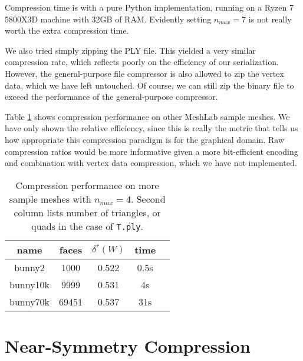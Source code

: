 \documentclass{egpubl}
\begin{document}
Compression time is with a pure Python implementation, running on a Ryzen 7 5800X3D machine with 32GB of RAM. Evidently setting $n_{max} = 7$ is not really worth the extra compression time.

We also tried simply zipping the PLY file. This yielded a very similar compression rate, which reflects poorly on the efficiency of our serialization. However, the general-purpose file compressor is also allowed to zip the vertex data, which we have left untouched. Of course, we can still zip the binary file to exceed the performance of the general-purpose compressor.


Table \ref{tab:more_meshes} shows compression performance on other MeshLab sample meshes.
We have only shown the relative efficiency, since this is really the metric that tells us how appropriate this compression paradigm is for the graphical domain. Raw compression ratios would be more informative given a more bit-efficient encoding and combination with vertex data compression, which we have not implemented.

\begin{table}
        \centering
        \begin{tabular}{|c|c|c|c|c|}
        \hline
        name & faces & $\delta^r(W)$ & time \\
        \hline
        bunny2 & 1000 & 0.522 & 0.5s \\
        bunny10k & 9999 & 0.531 & 4s \\
        bunny70k & 69451 & 0.537 & 31s \\
        \hline
\end{tabular}
\caption{Compression performance on more sample meshes with $n_{max} = 4$. Second column lists number of triangles, or quads in the case of \texttt{T.ply}.}
\label{tab:more_meshes}
\end{table}



\section{Near-Symmetry Compression} \label{sec:near_symmetry}
\end{document}
